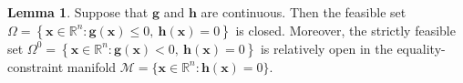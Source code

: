 \documentclass[11pt,pdflatex,sn-mathphys-ay]{sn-jnl}%
\theoremstyle{definition}
\theoremstyle{thmstyleone}%
\theoremstyle{thmstyletwo}%
\newtheorem{lemma}{Lemma}%
\theoremstyle{thmstylethree}%
\begin{document}
	
	
	
	\begin{lemma}
		\label{lem:closed}
		Suppose that $\bm g$ and $\bm h$ are continuous. Then the feasible set
		$\Omega=\left\{\bm x\in\mathbb R^n:
		\bm g(\bm x)\le0,\ \bm h(\bm x)=0\right\}$
		is closed. Moreover, the strictly feasible set
		$\Omega^0=
		\left\{\bm x\in\mathbb R^n:
		\bm g(\bm x)<0,\ \bm h(\bm x)=0\right\}$
		is relatively open in the equality-constraint manifold
		$\mathcal M=\{\bm x\in\mathbb R^n:\bm h(\bm x)=0\}.$
	\end{lemma}
	
\end{document}
